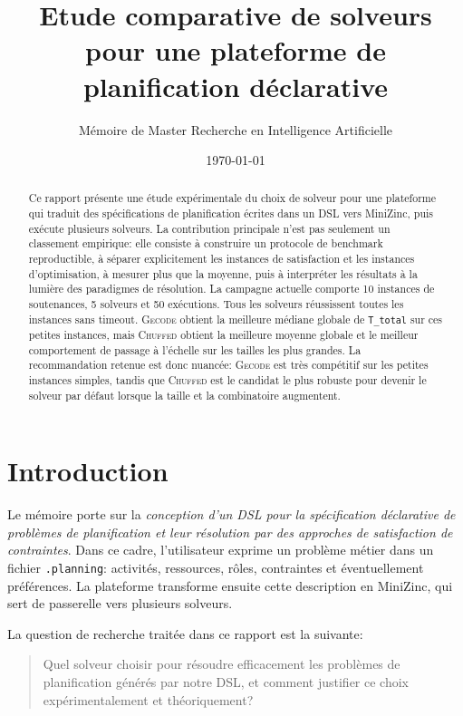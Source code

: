 \documentclass[12pt,a4paper]{article}
\title{Etude comparative de solveurs pour une plateforme \dsl{} de planification déclarative}
\author{Mémoire de Master Recherche en Intelligence Artificielle}
\date{\today}
\newcommand{\solver}[1]{\textnormal{\textsc{#1}}}
\newcommand{\mzn}{MiniZinc}
\newcommand{\dsl}{\textnormal{\textsc{DSL}}}
\begin{document}
\maketitle
\thispagestyle{empty}

\begin{abstract}
Ce rapport présente une étude expérimentale du choix de solveur pour une plateforme qui traduit des spécifications de planification écrites dans un \dsl{} vers \mzn{}, puis exécute plusieurs solveurs. La contribution principale n'est pas seulement un classement empirique: elle consiste à construire un protocole de benchmark reproductible, à séparer explicitement les instances de satisfaction et les instances d'optimisation, à mesurer plus que la moyenne, puis à interpréter les résultats à la lumière des paradigmes de résolution. La campagne actuelle comporte 10 instances de soutenances, 5 solveurs et 50 exécutions. Tous les solveurs réussissent toutes les instances sans timeout. \solver{Gecode} obtient la meilleure médiane globale de \texttt{T\_total} sur ces petites instances, mais \solver{Chuffed} obtient la meilleure moyenne globale et le meilleur comportement de passage à l'échelle sur les tailles les plus grandes. La recommandation retenue est donc nuancée: \solver{Gecode} est très compétitif sur les petites instances simples, tandis que \solver{Chuffed} est le candidat le plus robuste pour devenir le solveur par défaut lorsque la taille et la combinatoire augmentent.
\end{abstract}

\clearpage
\tableofcontents
\clearpage

\section{Introduction}

Le mémoire porte sur la \emph{conception d'un \dsl{} pour la spécification déclarative de problèmes de planification et leur résolution par des approches de satisfaction de contraintes}. Dans ce cadre, l'utilisateur exprime un problème métier dans un fichier \texttt{.planning}: activités, ressources, rôles, contraintes et éventuellement préférences. La plateforme transforme ensuite cette description en \mzn{}, qui sert de passerelle vers plusieurs solveurs.

La question de recherche traitée dans ce rapport est la suivante:

\begin{quote}
Quel solveur choisir pour résoudre efficacement les problèmes de planification générés par notre \dsl{}, et comment justifier ce choix expérimentalement et théoriquement?
\end{quote}
\end{document}
